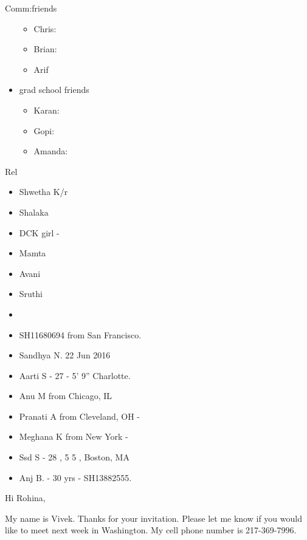 \documentclass[serif, mathserif, final]{beamer}
\begin{document}
\begin{frame}[label=socialInt]
\begin{block}{Comm:friends}
\begin{itemize}
\begin{itemize}
          \item \tiny Chris: 
          \item \tiny Brian: 
          \item \tiny Arif 
          \end{itemize}
        \item grad school friends 
          \begin{itemize} 
            \tiny \item \tiny  Karan: 
          \item \tiny Gopi: 
          \item \tiny Amanda:  
          \end{itemize}
        \end{itemize} 
      \end{block}
      
      \begin{block}{Rel} 
        \begin{itemize} 
          \small \item \small Shwetha K/r
        \item \small Shalaka 
        \item \tiny DCK girl -
        \item \small Mamta
        \item \small Avani 
        \item \small Sruthi 
          \item \small 
        \item \small SH11680694 from San Francisco. 
        \item \small Sandhya N. 22 Jun 2016 
        \item \small Aarti S - 27 - 5' 9'' Charlotte.       
        \item \small Anu M from Chicago, IL 
        \item \small Pranati A from Cleveland, OH - 
        \item \small Meghana K from New York - 
        \item \small Ssd S - 28 , 5 5 , Boston, MA 
        \item \small Anj B. - 30 yrs - SH13882555.
        \end{itemize}
      \end{block} 


\begin{block}

Hi Rohina,

My name is Vivek. Thanks for your invitation. Please let me know if you would like to
meet next week in Washington. My cell phone number is 217-369-7996.



\end{block}
\end{frame}
\end{document}
